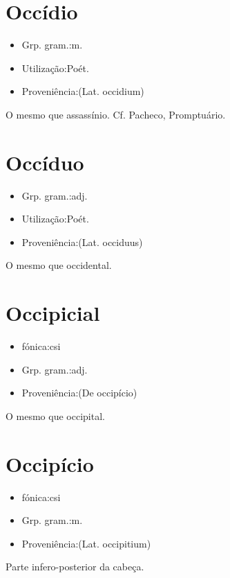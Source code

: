 \section{Occídio}
\begin{itemize}
\item {Grp. gram.:m.}
\end{itemize}
\begin{itemize}
\item {Utilização:Poét.}
\end{itemize}
\begin{itemize}
\item {Proveniência:(Lat. \textunderscore occidium\textunderscore )}
\end{itemize}
O mesmo que \textunderscore assassínio\textunderscore . Cf. Pacheco, \textunderscore Promptuário\textunderscore .
\section{Occíduo}
\begin{itemize}
\item {Grp. gram.:adj.}
\end{itemize}
\begin{itemize}
\item {Utilização:Poét.}
\end{itemize}
\begin{itemize}
\item {Proveniência:(Lat. \textunderscore occiduus\textunderscore )}
\end{itemize}
O mesmo que \textunderscore occidental\textunderscore .
\section{Occipicial}
\begin{itemize}
\item {fónica:csi}
\end{itemize}
\begin{itemize}
\item {Grp. gram.:adj.}
\end{itemize}
\begin{itemize}
\item {Proveniência:(De \textunderscore occipício\textunderscore )}
\end{itemize}
O mesmo que \textunderscore occipital\textunderscore .
\section{Occipício}
\begin{itemize}
\item {fónica:csi}
\end{itemize}
\begin{itemize}
\item {Grp. gram.:m.}
\end{itemize}
\begin{itemize}
\item {Proveniência:(Lat. \textunderscore occipitium\textunderscore )}
\end{itemize}
Parte infero-posterior da cabeça.
